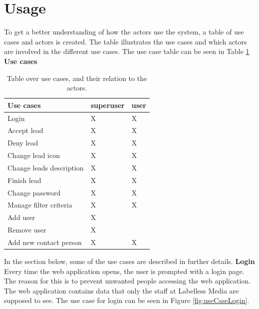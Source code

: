 \section{Usage}
To get a better understanding of how the actors use the system, a table of use cases and actors is created.
The table illustrates the use cases and which actors are involved in the different use cases. The use case table can be seen in Table \ref{tab:useCaseTable}
\newline \newline \noindent
\textbf{Use cases}\newline
\begin{table}[]
\begin{tabular}{|l|l|l|}
\hline
\textbf{Use cases}         & superuser & user \\ \hline
Login                      & X     & X      \\ \hline
Accept lead                & X     & X      \\ \hline
Deny lead                  & X     & X      \\ \hline
Change lead icon           & X     & X      \\ \hline
Change leads description   & X     & X      \\ \hline
Finish lead                & X     & X      \\ \hline
Change password            & X     & X      \\ \hline
Manage filter criteria     & X     & X      \\ \hline
Add user                   & X     &        \\ \hline
Remove user                & X     &        \\ \hline
Add new contact person     & X     & X      \\ \hline
\end{tabular}
\caption{Table over use cases, and their relation to the actors.}
\label{tab:useCaseTable}
\end{table}
\newpage
\noindent
In the section below, some of the use cases are described in further details. \newline \newline \noindent
\textbf{Login}\newline
Every time the web application opens, the user is prompted with a login page. The reason for this is to prevent unwanted people accessing the web application. The web application contains data that only the staff at Labelless Media are supposed to see. The use case for login can be seen in Figure \ref{fig:useCaseLogin}.
